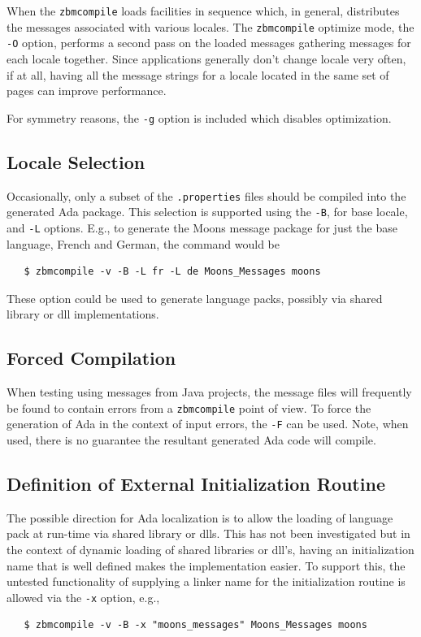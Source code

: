 When the \verb|zbmcompile| loads facilities in sequence which, in
general, distributes the messages associated with various locales.
The \verb|zbmcompile| optimize mode, the \verb|-O| option, performs
a second pass on the loaded messages gathering messages for each
locale together.  Since applications generally don't change locale
very often, if at all, having all the message strings for a locale
located in the same set of pages can improve performance.

For symmetry reasons, the \verb|-g| option is included which
disables optimization.

\subsection{Locale Selection}

Occasionally, only a subset of the \texttt{.properties} files should
be compiled into the generated Ada package.  This selection is supported
using the \verb|-B|, for base locale, and \verb|-L| options.  E.g., to
generate the Moons message package for just the base language, French and
German, the command would be
\begin{xmpl}
\begin{verbatim}
   $ zbmcompile -v -B -L fr -L de Moons_Messages moons
\end{verbatim}
\end{xmpl}
These option could be used to generate language packs, possibly via shared
library or dll implementations.

\subsection{Forced Compilation}

When testing using messages from Java projects, the message files will
frequently be found to contain errors from a \verb|zbmcompile| point of
view.  To force the generation of Ada in the context of input errors, the
\verb|-F| can be used.  Note, when used, there is no guarantee the resultant
generated Ada code will compile.

\subsection{Definition of External Initialization Routine}

The possible direction for Ada localization is to allow the loading of
language pack at run-time via shared library or dlls.  This has not been
investigated but in the context of dynamic loading of shared libraries or
dll's, having an initialization name that is well defined makes the
implementation easier.  To support this, the untested functionality of
supplying a linker name for the initialization routine is allowed via the
\verb|-x| option, e.g.,
\begin{xmpl}
\begin{verbatim}
   $ zbmcompile -v -B -x "moons_messages" Moons_Messages moons
\end{verbatim}
\end{xmpl}

